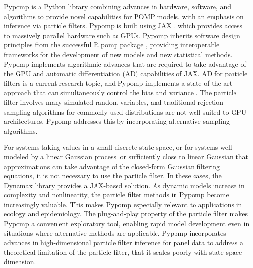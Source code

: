 \documentclass[twoside,11pt]{article}
\begin{document}
Pypomp is a Python library combining advances in hardware, software, and
algorithms to provide novel capabilities for POMP models, with an
emphasis on inference via particle filters. Pypomp is built using JAX
\citep{bradbury2018}, which provides access to massively parallel
hardware such as GPUs. Pypomp inherits software design principles from
the successful R pomp package \citep{king2016}, providing interoperable
frameworks for the development of new models and new statistical
methods. Pypomp implements algorithmic advances that are required to
take advantage of the GPU and automatic differentiation (AD)
capabilities of JAX. AD for particle filters is a current research
topic, and Pypomp implements a state-of-the-art approach that can
simultaneously control the bias and variance \citep{tan2024}. The
particle filter involves many simulated random variables, and
traditional rejection sampling algorithms for commonly used
distributions are not well suited to GPU architectures. Pypomp addresses
this by incorporating alternative sampling algorithms.

For systems taking values in a small discrete state space, or for
systems well modeled by a linear Gaussian process, or sufficiently close
to linear Gaussian that approximations can take advantage of the
closed-form Gaussian filtering equations, it is not necessary to use the
particle filter. In these cases, the Dynamax library
\citep{linderman2025} provides a JAX-based solution. As dynamic models
increase in complexity and nonlinearity, the particle filter methods in
Pypomp become increasingly valuable. This makes Pypomp especially
relevant to applications in ecology and epidemiology. The plug-and-play
property of the particle filter makes Pypomp a convenient exploratory
tool, enabling rapid model development even in situations where
alternative methods are applicable. Pypomp incorporates advances in
high-dimensional particle filter inference for panel data
\citep{breto2020} to address a theoretical limitation of the particle
filter, that it scales poorly with state space dimension.
\end{document}
